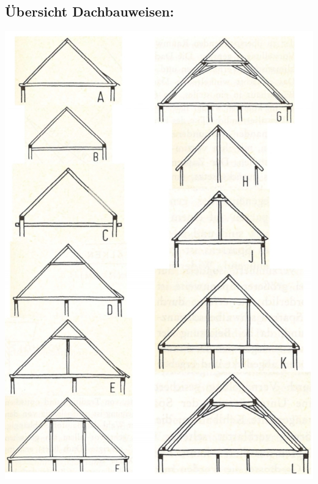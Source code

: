 \documentclass[fleqn,twoside]{article}
\begin{document}
    \subsection{Übersicht Dachbauweisen:}
        \begin{minipage}{0.45\textwidth}
            \includegraphics[width=1\textwidth]{Grafiken/Daecher/Uebersicht Daecher.jpg}
        \end{minipage}
\end{document}
